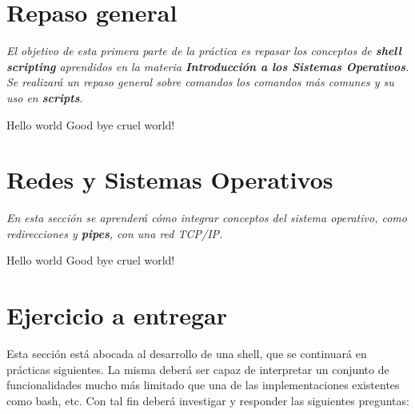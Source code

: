 \section{Repaso general}

\textit{El objetivo de esta primera parte de la práctica es repasar los
  conceptos de \textbf{shell scripting} aprendidos en la materia
  \textbf{Introducción a los Sistemas Operativos}. Se realizará un repaso
  general sobre comandos los comandos más comunes y su uso en
  \textbf{scripts}}.

\begin{questions}
\question Hello world
\question Good bye cruel world!
\end{questions}

\section{Redes y Sistemas Operativos}

\textit{En esta sección se aprenderá cómo integrar conceptos del sistema
  operativo, como redirecciones y \textbf{pipes}, con una red TCP/IP.}

\begin{questions}
\question Hello world
\question Good bye cruel world!
\end{questions}

\section{Ejercicio a entregar}
Esta sección está abocada al desarrollo de una shell, que se continuará en prácticas siguientes. La misma deberá ser capaz de interpretar un conjunto de funcionalidades mucho más limitado que una de las implementaciones existentes como bash, etc.
Con tal fin deberá investigar y responder las siguientes preguntas:

